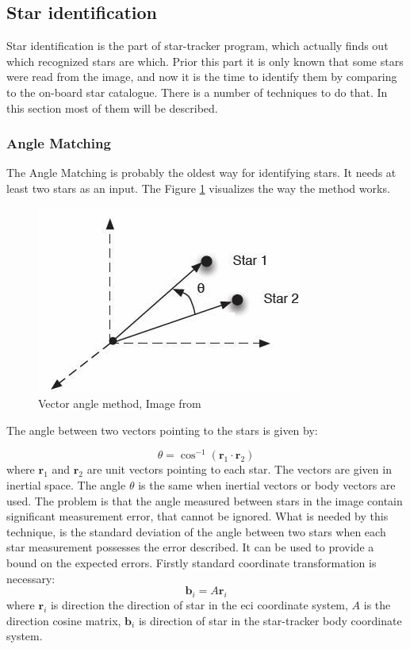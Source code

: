 \documentclass[12pt,a4paper,twoside]{article}
\begin{document}
\subsection{Star identification}

Star identification is the part of star-tracker program, which actually finds out which recognized stars are which. Prior this part it is only known that some stars were read from the image, and now it is the time to identify them by comparing to the on-board star catalogue. There is a number of techniques to do that\cite{spratling2009survey}. In this section most of them will be described.


\subsubsection{Angle Matching}
The Angle Matching is probably the oldest way for identifying stars. It needs at least two stars as an input\cite{gottlieb1978star}. The Figure \ref{fig:angle_matching} visualizes the way the method works.

\begin{figure}[ht]
\includegraphics[scale=0.7]{vector_angle_method.jpg}
\centering
\caption[Vector angle method]{Vector angle method, Image from \citet{gottlieb1978star}}
\label{fig:angle_matching}
\end{figure}

The angle between two vectors pointing to the stars is given by:

\begin{equation}
\theta = \cos^{-1}(\bm{r}_1 \cdot \bm{r}_2)
\end{equation}
where $\bm{r}_1$ and $\bm{r}_2$ are unit vectors pointing to each star. The vectors are given in inertial space. The angle $\theta$ is the same when inertial vectors or body vectors are used. The problem is that the angle measured between stars in the image contain significant measurement error, that cannot be ignored.
What is needed by this technique, is the standard deviation of the angle between two stars when each star measurement possesses the error described. It can be used to provide a bound on the expected errors.
Firstly standard coordinate transformation is necessary:
\begin{equation}
\bm{b}_i = A\bm{r}_i
\end{equation}
where $\bm{r}_i$ is direction the direction of star in the \gls{eci} coordinate system, $A$ is the direction cosine matrix, $\bm{b}_i$ is direction of star in the star-tracker body coordinate system.
\end{document}
